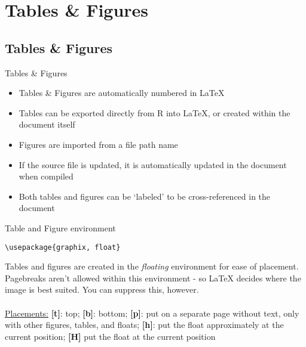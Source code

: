 \documentclass[xcolor=dvipsnames]{beamer}
\begin{document}
\section{Tables \& Figures}
\subsection{Tables \& Figures}

\begin{frame}{\LARGE{Tables \& Figures}}
\begin{itemize}
\item Tables \& Figures are automatically numbered in \LaTeX
\item Tables can be exported directly from R into \LaTeX, or created within the document itself
\item Figures are imported from a file path name
\item If the source file is updated, it is automatically updated in the document when compiled
\item Both tables and figures can be `labeled' to be cross-referenced in the document
\end{itemize}
\end{frame}

\begin{frame}[fragile]{\LARGE{Table and Figure environment}}
\begin{verbatim}
\usepackage{graphix, float}
\end{verbatim}
Tables and figures are created in the \textit{floating} environment for ease of placement. Pagebreaks aren't allowed within this environment - so LaTeX decides where the image is best suited. You can suppress this, however.\\~\\
\underline{Placements:} \textbf{[t]}: top; \textbf{[b]}: bottom; \textbf{[p]}: put on a separate page without text, only with other figures, tables, and floats; \textbf{[h]}: put the float approximately at the current position; \textbf{[H]} put the float at the current position 
\end{frame}
\end{document}
